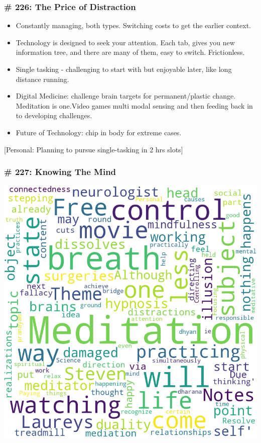 \begin{frame}[fragile]
\frametitle{\# 226: The Price of Distraction}

\begin{itemize}
\item Constantly managing, both types. Switching costs to get the earlier context.
\item Technology is designed to seek your attention. Each tab, gives you new information tree, and there are many of them, easy to switch. Frictionless.
\item Single tasking - challenging to start with but enjoyable later, like long distance running.
\item Digital Medicine: challenge brain targets for permanent/plastic change. Meditation is one.Video games multi modal sensing and then feeding back in to developing challenges.
\item Future of Technology: chip in body for extreme cases.
\end{itemize}

[Personal: Planning to pursue single-tasking in 2 hrs slots]
\end{frame}



\begin{frame}[fragile]
\frametitle{\# 227: Knowing The Mind}


 \begin{center}

\includegraphics[width=0.6\linewidth,keepaspectratio]{images/Review_Podcast_MakingSense_227_KnowingTheMind}
\end{center}

\end{frame}

